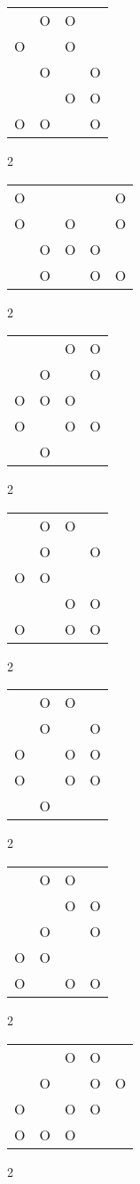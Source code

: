 \begin{tabular}{|m{0.2cm}m{0.2cm}m{0.2cm}m{0.2cm}|}\hline
 &O&O& \\
O& &O& \\
 &O& &O\\
 & &O&O\\
O&O& &O\\
\hline\end{tabular}2
\begin{tabular}{|m{0.2cm}m{0.2cm}m{0.2cm}m{0.2cm}m{0.2cm}|}\hline
O& & & &O\\
O& &O& &O\\
 &O&O&O& \\
 &O& &O&O\\
\hline\end{tabular}2
\begin{tabular}{|m{0.2cm}m{0.2cm}m{0.2cm}m{0.2cm}|}\hline
 & &O&O\\
 &O& &O\\
O&O&O& \\
O& &O&O\\
 &O& & \\
\hline\end{tabular}2
\begin{tabular}{|m{0.2cm}m{0.2cm}m{0.2cm}m{0.2cm}|}\hline
 &O&O& \\
 &O& &O\\
O&O& & \\
 & &O&O\\
O& &O&O\\
\hline\end{tabular}2
\begin{tabular}{|m{0.2cm}m{0.2cm}m{0.2cm}m{0.2cm}|}\hline
 &O&O& \\
 &O& &O\\
O& &O&O\\
O& &O&O\\
 &O& & \\
\hline\end{tabular}2
\begin{tabular}{|m{0.2cm}m{0.2cm}m{0.2cm}m{0.2cm}|}\hline
 &O&O& \\
 & &O&O\\
 &O& &O\\
O&O& & \\
O& &O&O\\
\hline\end{tabular}2
\begin{tabular}{|m{0.2cm}m{0.2cm}m{0.2cm}m{0.2cm}m{0.2cm}|}\hline
 & &O&O& \\
 &O& &O&O\\
O& &O&O& \\
O&O&O& & \\
\hline\end{tabular}2
